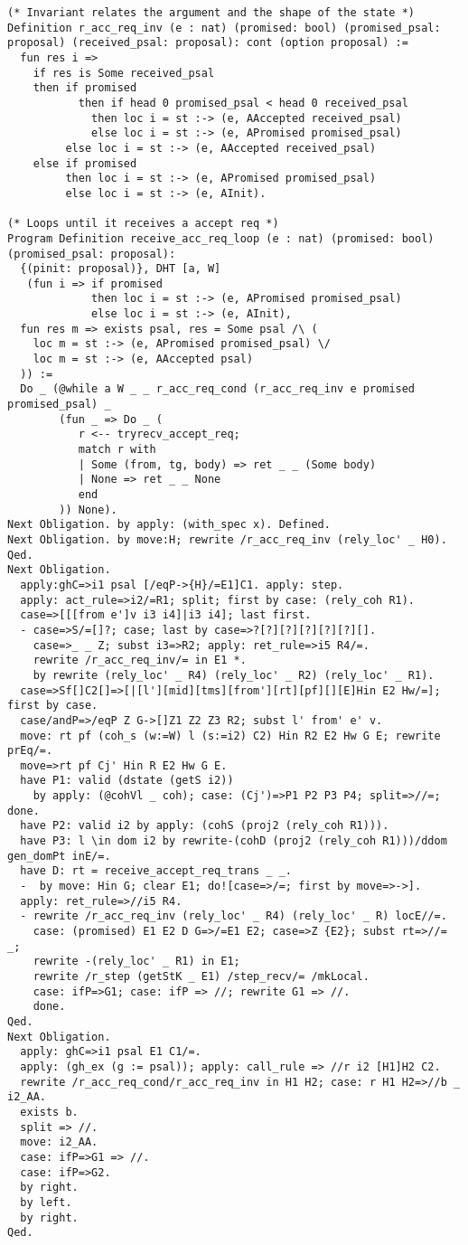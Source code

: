\begin{landscape}
\begin{multicols*}{2}
\begin{lstlisting}[style=SourceCodeListing]
(* Invariant relates the argument and the shape of the state *)
Definition r_acc_req_inv (e : nat) (promised: bool) (promised_psal: proposal) (received_psal: proposal): cont (option proposal) :=
  fun res i =>
    if res is Some received_psal
    then if promised
           then if head 0 promised_psal < head 0 received_psal
             then loc i = st :-> (e, AAccepted received_psal)
             else loc i = st :-> (e, APromised promised_psal)
         else loc i = st :-> (e, AAccepted received_psal)
    else if promised
         then loc i = st :-> (e, APromised promised_psal)
         else loc i = st :-> (e, AInit).

(* Loops until it receives a accept req *)
Program Definition receive_acc_req_loop (e : nat) (promised: bool) (promised_psal: proposal):
  {(pinit: proposal)}, DHT [a, W]
   (fun i => if promised
             then loc i = st :-> (e, APromised promised_psal)
             else loc i = st :-> (e, AInit),
  fun res m => exists psal, res = Some psal /\ (
    loc m = st :-> (e, APromised promised_psal) \/
    loc m = st :-> (e, AAccepted psal)
  )) :=
  Do _ (@while a W _ _ r_acc_req_cond (r_acc_req_inv e promised promised_psal) _
        (fun _ => Do _ (
           r <-- tryrecv_accept_req;
           match r with
           | Some (from, tg, body) => ret _ _ (Some body)
           | None => ret _ _ None
           end
        )) None).
Next Obligation. by apply: (with_spec x). Defined.
Next Obligation. by move:H; rewrite /r_acc_req_inv (rely_loc' _ H0). Qed.
Next Obligation.
  apply:ghC=>i1 psal [/eqP->{H}/=E1]C1. apply: step.
  apply: act_rule=>i2/=R1; split; first by case: (rely_coh R1).
  case=>[[[from e']v i3 i4]|i3 i4]; last first.
  - case=>S/=[]?; case; last by case=>?[?][?][?][?][?][].
    case=>_ _ Z; subst i3=>R2; apply: ret_rule=>i5 R4/=.
    rewrite /r_acc_req_inv/= in E1 *.
    by rewrite (rely_loc' _ R4) (rely_loc' _ R2) (rely_loc' _ R1).
  case=>Sf[]C2[]=>[|[l'][mid][tms][from'][rt][pf][][E]Hin E2 Hw/=]; first by case.
  case/andP=>/eqP Z G->[]Z1 Z2 Z3 R2; subst l' from' e' v.
  move: rt pf (coh_s (w:=W) l (s:=i2) C2) Hin R2 E2 Hw G E; rewrite prEq/=.
  move=>rt pf Cj' Hin R E2 Hw G E.
  have P1: valid (dstate (getS i2))
    by apply: (@cohVl _ coh); case: (Cj')=>P1 P2 P3 P4; split=>//=; done.
  have P2: valid i2 by apply: (cohS (proj2 (rely_coh R1))).
  have P3: l \in dom i2 by rewrite-(cohD (proj2 (rely_coh R1)))/ddom gen_domPt inE/=.
  have D: rt = receive_accept_req_trans _ _.
  -  by move: Hin G; clear E1; do![case=>/=; first by move=>->].
  apply: ret_rule=>//i5 R4.
  - rewrite /r_acc_req_inv (rely_loc' _ R4) (rely_loc' _ R) locE//=.
    case: (promised) E1 E2 D G=>/=E1 E2; case=>Z {E2}; subst rt=>//= _;
    rewrite -(rely_loc' _ R1) in E1;
    rewrite /r_step (getStK _ E1) /step_recv/= /mkLocal.
    case: ifP=>G1; case: ifP => //; rewrite G1 => //.
    done.
Qed.
Next Obligation.
  apply: ghC=>i1 psal E1 C1/=.
  apply: (gh_ex (g := psal)); apply: call_rule => //r i2 [H1]H2 C2.
  rewrite /r_acc_req_cond/r_acc_req_inv in H1 H2; case: r H1 H2=>//b _ i2_AA.
  exists b.
  split => //.
  move: i2_AA.
  case: ifP=>G1 => //.
  case: ifP=>G2.
  by right.
  by left.
  by right.
Qed.


\end{lstlisting}
\end{multicols*}
\end{landscape}
